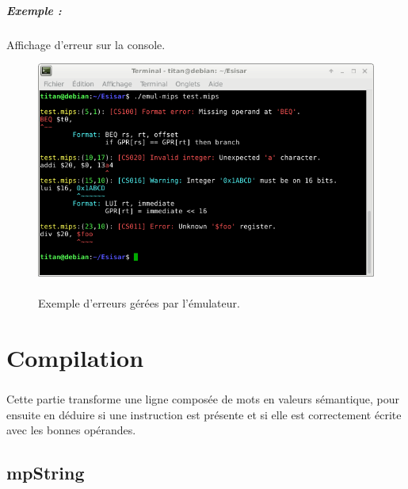 \documentclass[12pt]{report} %
\begin{document}
\paragraph{Exemple :} Affichage d'erreur sur la console.

\begin{figure}[H]
    \begin{center}
        \includegraphics[width=\textwidth]{MIPS-mpError-exemple.png}
    \end{center}
    \caption{\\Exemple d'erreurs gérées par l'émulateur.}
    \label{simulationBER}
\end{figure}


\chapter{Compilation}

\paragraph{}
Cette partie transforme une ligne composée de mots en valeurs sémantique, pour ensuite en déduire si une instruction est présente et si elle est correctement écrite avec les bonnes opérandes.

\section{mpString}
\end{document}
